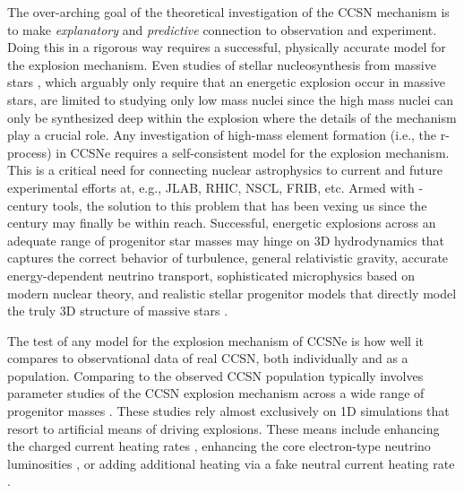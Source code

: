 The over-arching goal of the theoretical investigation of the CCSN mechanism is to make {\it explanatory} and {\it predictive} connection to observation and experiment.
Doing this in a rigorous way requires a successful, physically accurate model for the explosion mechanism.
Even studies of stellar nucleosynthesis from massive stars \citep[e.g.,][]{Woosley:1995, Woosley:2007d}, which arguably only require that an energetic explosion occur in massive stars, are limited to studying only low mass nuclei since the high mass nuclei can only be synthesized deep within the explosion where the details of the mechanism play a crucial role.
Any investigation of high-mass element formation (i.e., the r-process) in CCSNe requires a self-consistent model for the explosion mechanism.
This is a critical need for connecting nuclear astrophysics to current and future experimental efforts at, e.g., JLAB, RHIC, NSCL, FRIB, etc.
Armed with -century tools, the solution to this problem that has been vexing us since the  century may finally be within reach.
Successful, energetic explosions across an adequate range of progenitor star masses may hinge on 3D hydrodynamics that captures the correct behavior of turbulence, general relativistic gravity, accurate energy-dependent neutrino transport, sophisticated microphysics based on modern nuclear theory, and realistic stellar progenitor models that directly model the truly 3D structure of massive stars \citep[e.g.,][]{Meakin:2007, Arnett:2011, Couch:2015a}.

The test of any model for the explosion mechanism of CCSNe is how well it compares to observational data of real CCSN, both individually and as a population.
Comparing to the observed CCSN population typically involves parameter studies of the CCSN explosion mechanism across a wide range of progenitor masses \citep[e.g.,][]{OConnor:2011, Ugliano:2012, OConnor:2013, Ertl:2015, Sukhbold:2015, Perego:2015}.
These studies rely almost exclusively on 1D simulations that resort to artificial means of driving explosions.
These means include enhancing the charged current heating rates \citep{OConnor:2011}, enhancing the core electron-type neutrino luminosities \citep{Ugliano:2012, Ertl:2015, Sukhbold:2015}, or adding additional heating via a fake neutral current heating rate \citep{Perego:2015}.


